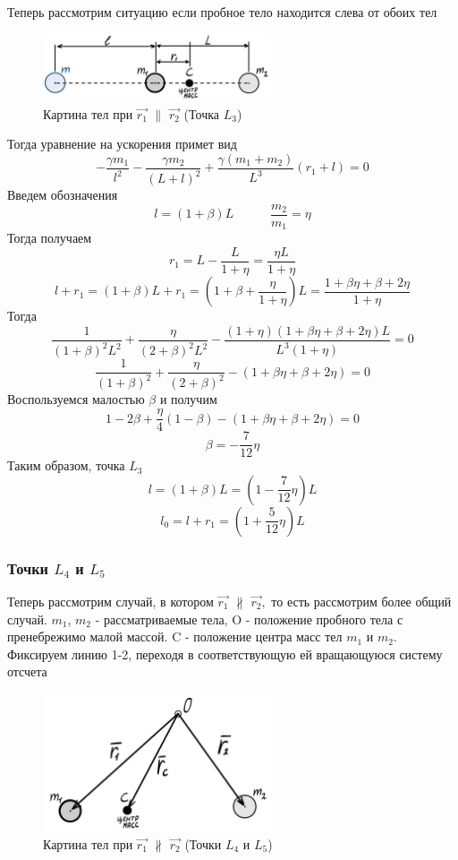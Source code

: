 \documentclass[a4paper,12pt]{article}
\begin{document}
Теперь рассмотрим ситуацию если пробное тело находится слева от обоих тел
\begin{figure}[H]
    \begin{center}
	\includegraphics[width=0.6\textwidth]{L3.jpg}
	\caption{Картина тел при $\vec{r_1}$ $\|$ $\vec{r_2}$ (Точка $L_3$)}
    \end{center}
\end{figure}
Тогда уравнение на ускорения примет вид
$$ -\frac{\gamma m_1}{l^2} - \frac{\gamma m_2}{(L + l)^2} + \frac{\gamma (m_1 + m_2)}{L^3} (r_1 + l) = 0 $$
Введем обозначения
$$ l = (1 + \beta) L \hspace{35pt} \frac{m_2}{m_1} = \eta $$
Тогда получаем
$$ r_1 = L - \frac{L}{1 + \eta} = \frac{\eta L}{1 + \eta} $$
$$ l + r_1 = (1 + \beta) L + r_1 = \left(1 + \beta + \frac{\eta}{1 + \eta}\right) L = \frac{1 + \beta \eta + \beta + 2 \eta}{1 + \eta} $$
Тогда
$$ \frac{1}{(1 + \beta)^2 L^2} + \frac{\eta}{(2 + \beta)^2 L^2} - \frac{(1 + \eta)(1 + \beta \eta + \beta + 2 \eta) L}{L^3 (1 + \eta)} = 0 $$
$$ \frac{1}{(1 + \beta)^2} + \frac{\eta}{(2 + \beta)^2} - (1 + \beta \eta + \beta + 2 \eta) = 0 $$
Воспользуемся малостью $\beta$ и получим
$$ 1 - 2 \beta + \frac{\eta}{4}(1 - \beta) - (1 + \beta \eta + \beta + 2 \eta) = 0 $$
$$ \beta = -\frac{7}{12} \eta $$
Таким образом, точка $L_3$
$$ l   = (1 + \beta) L = \left(1 - \frac{7}{12} \eta\right) L $$
$$ l_0 =  l + r_1      = \left(1 + \frac{5}{12} \eta\right) L $$ 

\subsubsection{Точки $L_4$ и $L_5$}

Теперь рассмотрим случай, в котором $\vec{r_1}$ $\nparallel$ $\vec{r_2},$ то есть рассмотрим более общий случай. $m_1$, $m_2$ - рассматриваемые тела, O - положение пробного тела с пренебрежимо малой массой.
C - положение центра масс тел $m_1$ и $m_2$.
Фиксируем линию 1-2, переходя в соответствующую ей вращающуюся систему отсчета

\begin{figure}[H]
    \begin{center}
        \includegraphics[width=0.6\textwidth]{L4L5.jpg}
	\caption{Картина тел при $\vec{r_1}$ $\nparallel$ $\vec{r_2}$ (Точки $L_4$ и $L_5$)}
    \end{center}
\end{figure}
\end{document}
